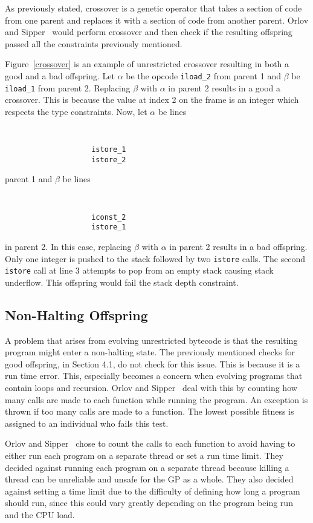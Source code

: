 \documentclass{sig-alternate}
\begin{document}
As previously stated, crossover is a genetic operator that takes a section of code from one parent and replaces it with a section of code from another parent. Orlov and Sipper~\cite{FINCH:2011} would perform crossover and then check if the resulting offspring passed all the constraints previously mentioned.\par 

Figure~\ref{crossover} is an example of unrestricted crossover resulting in both a good and a bad offspring. Let $\alpha$ be the opcode \texttt{iload\_2} from parent 1 and $\beta$ be \texttt{iload\_1} from parent 2. Replacing $\beta$ with $\alpha$ in parent 2 results in a good a crossover. This is because the value at index 2 on the frame is an integer which respects the type constraints. Now, let $\alpha$ be lines
{\tt
\begin{verbatim}
                    istore_1
                    istore_2
\end{verbatim}}

\noindent parent 1 and $\beta$ be lines
{\tt
\begin{verbatim}
                    iconst_2
                    istore_1
\end{verbatim}}
\noindent 
in parent 2. In this case, replacing $\beta$ with $\alpha$ in parent 2 results in a bad offspring. Only one integer is pushed to the stack followed by two \texttt{istore} calls. The second \texttt{istore} call at line 3 attempts to pop from an empty stack causing stack underflow. This offspring would fail the stack depth constraint.

\subsection{Non-Halting Offspring}
A problem that arises from evolving unrestricted bytecode is that the resulting program might enter a non-halting state. The previously mentioned checks for good offspring, in Section 4.1, do not check for this issue. This is because it is a run time error. This, especially becomes a concern when evolving programs that contain loops and recursion.
Orlov and Sipper~\cite{FINCH:2011} deal with this by counting how many calls are made to each function while running the program. An exception is thrown if too many calls are made to a function. The lowest possible fitness is assigned to an individual who fails this test.\par

Orlov and Sipper~\cite{FINCH:2011} chose to count the calls to each function to avoid having to either run each program on a separate thread or set a run time limit. They decided against running each program on a separate thread because killing a thread can be unreliable and unsafe for the GP as a whole. They also decided against setting a time limit due to the difficulty of defining how long a program should run, since this could vary greatly depending on the program being run and the CPU load.
\end{document}
